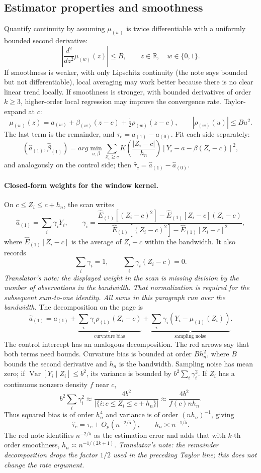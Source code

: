 \subsection{Estimator properties and smoothness}
Quantify continuity by assuming $\mu_{(w)}$ is twice differentiable with a uniformly bounded second derivative:
\[
\left|\frac{d^2}{dz^2}\mu_{(w)}(z)\right|\leq B,
\qquad z\in\mathbb R,\quad w\in\{0,1\}.
\]
If smoothness is weaker, with only Lipschitz continuity (the note says bounded but not differentiable), local averaging may work better because there is no clear linear trend locally. If smoothness is stronger, with bounded derivatives of order $k\geq3$, higher-order local regression may improve the convergence rate.
Taylor-expand at $c$:
\[
\mu_{(w)}(z)=a_{(w)}+\beta_{(w)}(z-c)+\tfrac12\rho_{(w)}(z-c),
\qquad |\rho_{(w)}(u)|\leq Bu^2.
\]
The last term is the remainder, and $\tau_c=a_{(1)}-a_{(0)}$. Fit each side separately:
\[
(\widehat a_{(1)},\widehat\beta_{(1)})=arg\min_{a,\beta}
\sum_{Z_i\geq c}K\left(\frac{|Z_i-c|}{h_n}\right)[Y_i-a-\beta(Z_i-c)]^2,
\]
and analogously on the control side; then $\widehat\tau_c=\widehat a_{(1)}-\widehat a_{(0)}$.
\paragraph{Closed-form weights for the window kernel.}
On $c\leq Z_i\leq c+h_n$, the scan writes
\[
\widehat a_{(1)}=\sum_i\gamma_iY_i,\qquad
\gamma_i=\frac{\widehat E_{(1)}[(Z_i-c)^2]-\widehat E_{(1)}[Z_i-c](Z_i-c)}
{\widehat E_{(1)}[(Z_i-c)^2]-\widehat E_{(1)}[Z_i-c]^2},
\]
where $\widehat E_{(1)}[Z_i-c]$ is the average of $Z_i-c$ within the bandwidth. It also records
\[
\sum_i\gamma_i=1,\qquad \sum_i\gamma_i(Z_i-c)=0.
\]
\textit{Translator's note: the displayed weight in the scan is missing division by the number of observations in the bandwidth. That normalization is required for the subsequent sum-to-one identity. All sums in this paragraph run over the bandwidth.}
The decomposition on the page is
\[
\widehat a_{(1)}=a_{(1)}+\underbrace{\sum_i\gamma_i\rho_{(1)}(Z_i-c)}_{\text{curvature bias}}
+\underbrace{\sum_i\gamma_i(Y_i-\mu_{(1)}(Z_i))}_{\text{sampling noise}}.
\]
The control intercept has an analogous decomposition. The red arrows say that both terms need bounds. Curvature bias is bounded at order $Bh_n^2$, where $B$ bounds the second derivative and $h_n$ is the bandwidth. Sampling noise has mean zero; if $\operatorname{Var}[Y_i\mid Z_i]\leq b^2$, its variance is bounded by $b^2\sum_i\gamma_i^2$.
If $Z_i$ has a continuous nonzero density $f$ near $c$,
\[
b^2\sum_i\gamma_i^2\approx\frac{4b^2}{|\{i:c\leq Z_i\leq c+h_n\}|}
\approx\frac{4b^2}{f(c)nh_n}.
\]
Thus squared bias is of order $h_n^4$ and variance is of order $(nh_n)^{-1}$, giving
\[
\widehat\tau_c=\tau_c+O_p(n^{-2/5}),\qquad h_n\asymp n^{-1/5}.
\]
The red note identifies $n^{-2/5}$ as the estimation error and adds that with $k$-th order smoothness, $h_n\asymp n^{-1/(2k+1)}$.
\textit{Translator's note: the remainder decomposition drops the factor $1/2$ used in the preceding Taylor line; this does not change the rate argument.}
